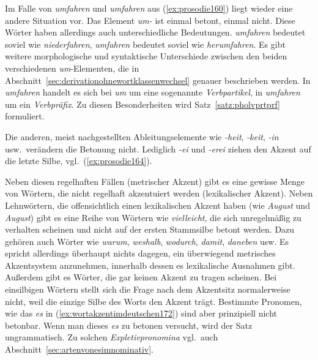 
Im Falle von \textit{\Akz umfahren} und \textit{um\Akz fahren} aus (\ref{ex:prosodie160}) liegt wieder eine andere Situation vor.
Das Element \textit{um-} ist einmal betont, einmal nicht.
Diese Wörter haben allerdings auch unterschiedliche Bedeutungen.
\textit{\Akz umfahren} bedeutet soviel wie \textit{niederfahren}, \textit{um\Akz fahren} bedeutet soviel wie \textit{herumfahren}.
Es gibt weitere morphologische und syntaktische Unterschiede zwischen den beiden verschiedenen \textit{um}-Elementen, die in Abschnitt~\ref{sec:derivationohnewortklassenwechsel} genauer beschrieben werden.
In \textit{\Akz umfahren} handelt es sich bei \textit{um} um eine sogenannte \textit{Verbpartikel}, in \textit{um\Akz fahren} um ein \textit{Verbpräfix}.
Zu diesen Besonderheiten wird Satz~\ref{satz:pholvprtprf} formuliert.


Die anderen, meist nachgestellten Ableitungselemente wie \textit{-heit}, \textit{-keit}, \textit{-in} usw.\ verändern die Betonung nicht.
Lediglich \textit{-ei} und \textit{-erei} ziehen den Akzent auf die letzte Silbe, vgl.\ (\ref{ex:prosodie164}).

Neben diesen regelhaften Fällen (metrischer Akzent) gibt es eine gewisse Menge von Wörtern, die nicht regelhaft akzentuiert werden (lexikalischer Akzent).
Neben Lehnwörtern, die offensichtlich einen lexikalischen Akzent haben (wie \textit{\Akz August} und \textit{Au\Akz gust}) gibt es eine Reihe von Wörtern wie \textit{vie\Akz lleicht}, die sich unregelmäßig zu verhalten scheinen und nicht auf der ersten Stammsilbe betont werden.
Dazu gehören auch Wörter wie \textit{wa\Akz rum}, \textit{wes\Akz halb}, \textit{wo\Akz durch}, \textit{da\Akz mit}, \textit{da\Akz neben} usw.
Es spricht allerdings überhaupt nichts dagegen, ein überwiegend metrisches Akzentsystem anzunehmen, innerhalb dessen es lexikalische Ausnahmen gibt.
Außerdem gibt es Wörter, die gar keinen Akzent zu tragen scheinen.
Bei einsilbigen Wörtern stellt sich die Frage nach dem Akzentsitz normalerweise nicht, weil die einzige Silbe des Worts den Akzent trägt.
Bestimmte Pronomen, wie das \textit{es} in (\ref{ex:wortakzentimdeutschen172}) sind aber prinzipiell nicht betonbar.
Wenn man dieses \textit{es} zu betonen versucht, wird der Satz ungrammatisch.
Zu solchen \textit{Expletivpronomina} vgl.\ auch Abschnitt~\ref{sec:artenvonesimnominativ}.\label{abs:wortakzentimdeutschen171}

